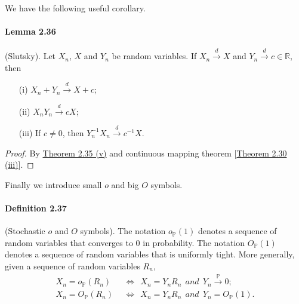 \documentclass{article}
\numberwithin{equation}{section}
\renewcommand{\P}{\mathbb{P}}
\theoremstyle{plain}
\theoremstyle{definition}
\begin{document}
We have the following useful corollary.
\paragraph{Lemma 2.36\label{lemma:2.36}} (Slutsky). Let $X_n$, $X$ and $Y_n$ be random variables. If $X_n\overset{d}{\to}X$ and $Y_n\overset{d}{\to}c\in\mathbb{R}$, then
\begin{itemize}
	\item[(i)] $X_n+Y_n\overset{d}{\to}X+c$;
	\item[(ii)] $X_nY_n\overset{d}{\to}cX$;
	\item[(iii)] If $c\neq 0$, then $Y_n^{-1}X_n\overset{d}{\to}c^{-1}X$.
\end{itemize}
\begin{proof}
By \hyperref[thm:2.35]{Theorem 2.35 (v)} and continuous mapping theorem [\hyperref[thm:2.30]{Theorem 2.30 (iii)}].
\end{proof}

Finally we introduce small $o$ and big $O$ symbols.
\paragraph{Definition 2.37\label{def:2.37}} (Stochastic $o$ and $O$ symbols). The notation $o_\P(1)$ denotes a sequence of random variables that converges to $0$ in probability. The notation $O_\P(1)$ denotes a sequence of random variables that is uniformly tight.  More generally, given a sequence of random variables $R_n$,
\begin{align*}
	X_n=o_\P(R_n)\ \ &\Leftrightarrow\ \ X_n=Y_nR_n\ \ \textit{and}\ \ Y_n\overset{\P}{\to} 0;\\
	X_n=O_\P(R_n)\ \ &\Leftrightarrow\ \ X_n=Y_nR_n\ \ \textit{and}\ \ Y_n=O_\P(1).
\end{align*}
\end{document}
